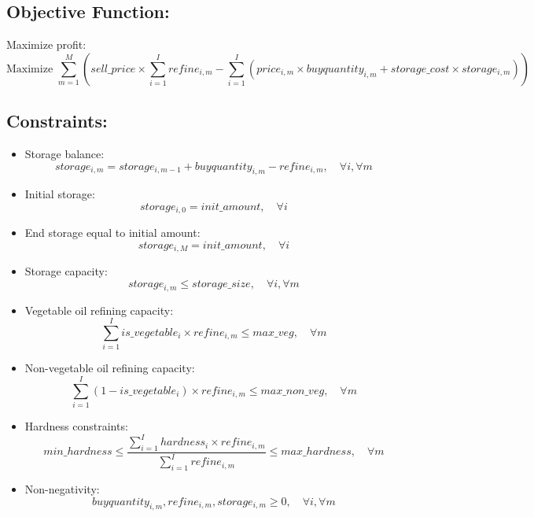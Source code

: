 \documentclass{article}
\begin{document}
\subsection*{Objective Function:}
Maximize profit:
\[
\text{Maximize } \sum_{m=1}^{M} \left( sell\_price \times \sum_{i=1}^{I} refine_{i,m} - \sum_{i=1}^{I} (price_{i,m} \times buyquantity_{i,m} + storage\_cost \times storage_{i,m}) \right)
\]

\subsection*{Constraints:}
\begin{itemize}
    \item Storage balance:
    \[
    storage_{i,m} = storage_{i,m-1} + buyquantity_{i,m} - refine_{i,m}, \quad \forall i, \forall m
    \]
    \item Initial storage:
    \[
    storage_{i,0} = init\_amount, \quad \forall i
    \]
    \item End storage equal to initial amount:
    \[
    storage_{i,M} = init\_amount, \quad \forall i
    \]
    \item Storage capacity:
    \[
    storage_{i,m} \leq storage\_size, \quad \forall i, \forall m
    \]
    \item Vegetable oil refining capacity:
    \[
    \sum_{i=1}^{I} is\_vegetable_{i} \times refine_{i,m} \leq max\_veg, \quad \forall m
    \]
    \item Non-vegetable oil refining capacity:
    \[
    \sum_{i=1}^{I} (1 - is\_vegetable_{i}) \times refine_{i,m} \leq max\_non\_veg, \quad \forall m
    \]
    \item Hardness constraints:
    \[
    min\_hardness \leq \frac{\sum_{i=1}^{I} hardness_{i} \times refine_{i,m}}{\sum_{i=1}^{I} refine_{i,m}} \leq max\_hardness, \quad \forall m
    \]
    \item Non-negativity:
    \[
    buyquantity_{i,m}, refine_{i,m}, storage_{i,m} \geq 0, \quad \forall i, \forall m
    \]
\end{itemize}
\end{document}
